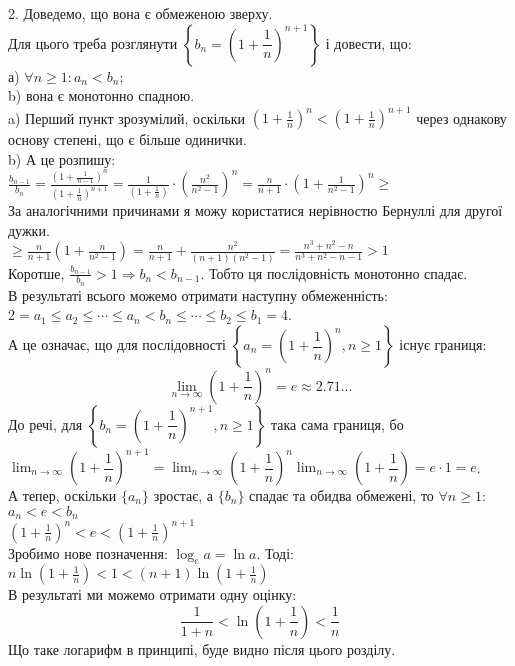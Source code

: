 \documentclass[a4paper, 14pt]{article}
\theoremstyle{theoremdd}
\theoremstyle{theoremdd}
\theoremstyle{theoremdd}
\theoremstyle{theoremdd}
\theoremstyle{theoremdd}
\theoremstyle{theoremdd}
\theoremstyle{theoremdd}
\theoremstyle{theoremdd}
\begin{document}
	2. Доведемо, що вона є обмеженою зверху.\\
	Для цього треба розглянути $\left\{ b_n = \left( 1 + \dfrac{1}{n} \right)^{n+1} \right\}$ і довести, що:\\
	а) $\forall n \geq 1: a_n < b_n$;\\
	b) вона є монотонно спадною.
	\bigskip \\
	a) Перший пункт зрозумілий, оскільки $\displaystyle \left(1+\frac{1}{n} \right)^n < \left(1+\frac{1}{n} \right)^{n+1}$ через однакову основу степені, що є більше одинички.\\
	b) А це розпишу:\\
	$\displaystyle \frac{b_{n-1}}{b_n} = \frac{\displaystyle \left(1+\frac{1}{n-1} \right)^{n}}{\displaystyle \left(1+\frac{1}{n} \right)^{n+1}} = \frac{1}{\displaystyle \left(1+\frac{1}{n}\right)} \cdot \left(\frac{n^2}{n^2-1}\right)^n = \frac{n}{n+1} \cdot \left(1+\frac{1}{n^2-1} \right)^n \boxed{\geq}$\\
	За аналогічними причинами я можу користатися нерівностю Бернуллі для другої дужки.\\
	$\displaystyle \boxed{\geq} \frac{n}{n+1} \left(1+\frac{n}{n^2-1}\right) = \frac{n}{n+1} + \frac{n^2}{(n+1)(n^2-1)} = \frac{n^3+n^2-n}{n^3+n^2-n-1} > 1$\\
	Коротше, $\displaystyle \frac{b_{n-1}}{b_n} > 1 \Rightarrow b_n < b_{n-1}$. Тобто ця послідовність монотонно спадає.\\
	В результаті всього можемо отримати наступну обмеженність:\\
	$2=a_1 \leq a_2 \leq \cdots \leq a_n < b_n \leq \cdots \leq b_2 \leq b_1 = 4$.\\
	А це означає, що для послідовності $\left\{a_n = \left(1 + \dfrac{1}{n} \right)^n, n \geq 1 \right\}$ існує границя:
	$$\displaystyle \lim_{n \to \infty}\left(1+\frac{1}{n} \right)^n = e \approx 2.71...$$
	До речі, для $\left\{b_n = \left( 1 + \dfrac{1}{n} \right)^{n+1}, n \geq 1 \right\}$ така сама границя, бо \\ $\displaystyle\lim_{n \to \infty} \left( 1 + \dfrac{1}{n} \right)^{n+1} = \lim_{n \to \infty} \left( 1 + \dfrac{1}{n} \right)^n \lim_{n \to \infty} \left(1 + \dfrac{1}{n} \right) = e \cdot 1 = e$.
	\bigskip \\	
	А тепер, оскільки $\{a_n \}$ зростає, а $\{b_n \}$ спадає та обидва обмежені, то $\forall n \geq 1:$\\
	$a_n<e<b_n$\\
	$\displaystyle \left(1+\frac{1}{n} \right)^n < e < \left(1+\frac{1}{n} \right)^{n+1}$\\
	Зробимо нове позначення: $\log_{e} a =\ln a$. Тоді:\\
	$\displaystyle n \ln \left(1+\frac{1}{n} \right) < 1 < (n+1) \ln \left(1+\frac{1}{n} \right)$\\
	В результаті ми можемо отримати одну оцінку:
	$$\frac{1}{1+n} < \ln (1+\frac{1}{n}) < \frac{1}{n}$$
	Що таке логарифм в принципі, буде видно після цього розділу.
	
\end{document}
